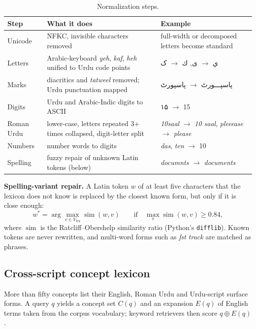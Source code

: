 \documentclass[11pt,a4paper]{article}
\newcommand{\ur}[1]{{\urdufont\beginR #1\endR}}
\begin{document}
\begin{table}[H]
\centering\small
\begin{tabularx}{\textwidth}{@{}l X X@{}}
\toprule
Step & What it does & Example\\
\midrule
Unicode & NFKC, invisible characters removed & full-width or decomposed letters become standard\\
Letters & Arabic-keyboard \emph{yeh}, \emph{kaf}, \emph{heh} unified to Urdu code points & \ur{ي} $\to$ \ur{ی},\; \ur{ك} $\to$ \ur{ک}\\
Marks & diacritics and \emph{tatweel} removed; Urdu punctuation mapped & \ur{پاسپـــورٹ} $\to$ \ur{پاسپورٹ}\\
Digits & Urdu and Arabic-Indic digits to ASCII & \ur{۱۵} $\to$ 15\\
Roman Urdu & lower-case, letters repeated 3+ times collapsed, digit-letter split & \emph{10saal} $\to$ \emph{10 saal}, \emph{pleeease} $\to$ \emph{please}\\
Numbers & number words to digits & \emph{das}, \emph{ten} $\to$ 10\\
Spelling & fuzzy repair of unknown Latin tokens (below) & \emph{documnts} $\to$ \emph{documents}\\
\bottomrule
\end{tabularx}
\caption{Normalization steps.}
\end{table}

\textbf{Spelling-variant repair.} A Latin token $w$ of at least five characters that the lexicon does not know is replaced by the
closest known form, but only if it is close enough:
\begin{equation}
w^\ast = \arg\max_{v \in V_{\text{lex}}} \operatorname{sim}(w, v) \qquad \text{if} \quad \max_{v} \operatorname{sim}(w, v) \geq 0.84,
\end{equation}
where $\operatorname{sim}$ is the Ratcliff--Obershelp similarity ratio (Python's \texttt{difflib}). Known tokens are never
rewritten, and multi-word forms such as \emph{fst track} are matched as phrases.

\subsection{Cross-script concept lexicon}
\label{sec:lexicon}
More than fifty concepts list their English, Roman Urdu and Urdu-script surface forms. A query $q$ yields a concept set $C(q)$
and an expansion $E(q)$ of English terms taken from the corpus vocabulary; keyword retrievers then score $q \oplus E(q)$.
\end{document}

